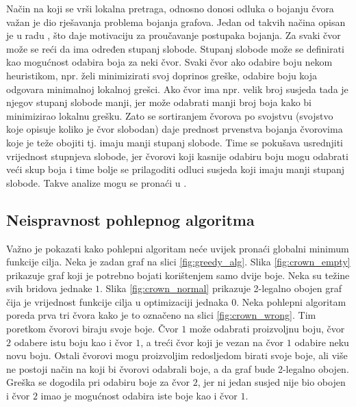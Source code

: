 \documentclass[times, utf8, diplomski, numeric]{fer}
\begin{document}
Način na koji se vrši lokalna pretraga, odnosno donosi odluka o bojanju čvora važan je dio rješavanja problema bojanja grafova. Jedan od takvih načina opisan je u radu \cite{lit11}, što daje motivaciju za proučavanje postupaka bojanja. Za svaki čvor može se reći da ima određen stupanj slobode. Stupanj slobode može se definirati kao mogućnost odabira boja za neki čvor. Svaki čvor ako odabire boju nekom heuristikom, npr. želi minimizirati svoj doprinos greške, odabire boju koja odgovara minimalnoj lokalnoj grešci. Ako čvor ima npr. velik broj susjeda tada je njegov stupanj slobode manji, jer može odabrati manji broj boja kako bi minimizirao lokalnu grešku. Zato se sortiranjem čvorova po svojstvu (svojstvo koje opisuje koliko je čvor slobodan) daje prednost prvenstva bojanja čvorovima koje je teže obojiti tj. imaju manji stupanj slobode. Time se pokušava usrednjiti vrijednost stupnjeva slobode, jer čvorovi koji kasnije odabiru boju mogu odabrati veći skup boja i time bolje se prilagoditi odluci susjeda koji imaju manji stupanj slobode. Takve analize mogu se pronaći u \cite{lit5, lit12}.

\subsection{Neispravnost pohlepnog algoritma}

Važno je pokazati kako pohlepni algoritam neće uvijek pronaći globalni minimum funkcije cilja. Neka je zadan graf na slici \ref{fig:greedy_alg}.
Slika \ref{fig:crown_empty} prikazuje graf koji je potrebno bojati korištenjem samo dvije boje. Neka su težine svih bridova jednake $1$. Slika \ref{fig:crown_normal} prikazuje 2-legalno obojen graf čija je vrijednost funkcije cilja u optimizaciji jednaka $0$. 
Neka pohlepni algoritam poreda prva tri čvora kako je to označeno na slici \ref{fig:crown_wrong}. Tim poretkom čvorovi biraju svoje boje. Čvor $1$ može odabrati proizvoljnu boju, čvor $2$ odabere istu boju kao i čvor $1$, a treći čvor koji je vezan na čvor $1$ odabire neku novu boju. Ostali čvorovi mogu proizvoljim redosljedom birati svoje boje, ali više ne postoji način na koji bi čvorovi odabrali boje, a da graf bude 2-legalno obojen. Greška se dogodila pri odabiru boje za čvor $2$, jer ni jedan susjed nije bio obojen i čvor $2$ imao je mogućnost odabira iste boje kao i čvor $1$.
\end{document}
